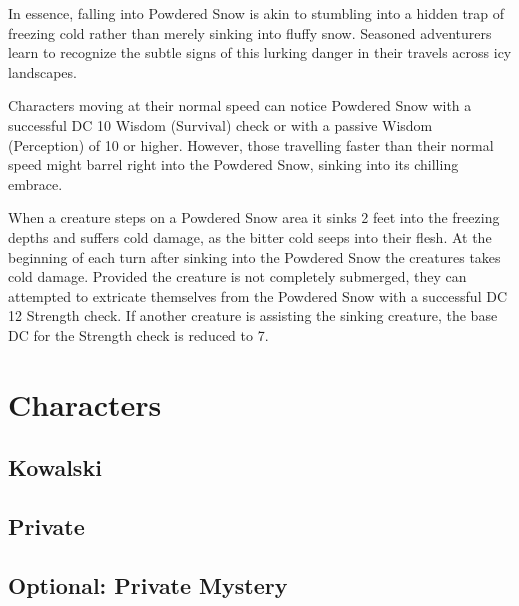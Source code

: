 In essence, falling into Powdered Snow is akin to stumbling into a hidden trap of freezing cold rather than merely sinking into fluffy snow. Seasoned adventurers learn to recognize the subtle signs of this lurking danger in their travels across icy landscapes.

Characters moving at their normal speed can notice Powdered Snow with a successful DC 10 Wisdom (Survival) check or with a passive Wisdom (Perception) of 10 or higher. However, those travelling faster than their normal speed might barrel right into the Powdered Snow, sinking into its chilling embrace.

When a creature steps on a Powdered Snow area it sinks 2 feet into the freezing depths and suffers  cold damage, as the bitter cold seeps into their flesh. At the beginning of each turn after sinking into the Powdered Snow the creatures takes  cold damage. Provided the creature is not completely submerged, they can attempted to extricate themselves from the Powdered Snow with a successful DC 12 Strength check. If another creature is assisting the sinking creature, the base DC for the Strength check is reduced to 7.

\chapter{Characters}
\section*{Kowalski}\clearpage{}
\clearpage
\section*{Private}
\clearpage
\section*{Optional: Private Mystery}
